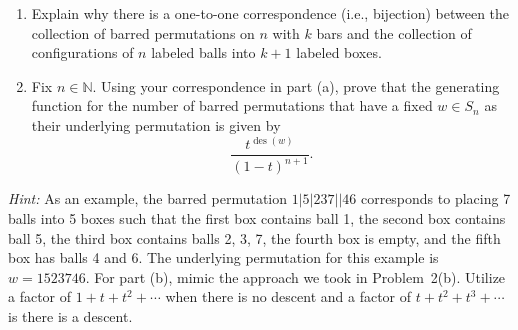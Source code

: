 \documentclass[11pt]{article}%
\theoremstyle{definition}
\DeclareMathOperator{\des}{des}
\begin{document}
\begin{enumerate}
\begin{enumerate}
\item Explain why there is a one-to-one correspondence (i.e., bijection) between the collection of barred permutations on $n$ with $k$ bars and the collection of configurations of $n$ labeled balls into $k+1$ labeled boxes.
\item Fix $n\in \mathbb{N}$. Using your correspondence in part (a), prove that the generating function for the number of barred permutations that have a fixed $w\in S_n$ as their underlying permutation is given by
\[
\frac{t^{\des(w)}}{(1-t)^{n+1}}.
\]
\end{enumerate}
\emph{Hint:} As an example, the barred permutation  $1|5|237||46$ corresponds to placing 7 balls into 5 boxes such that the first box contains ball 1, the second box contains ball 5, the third box contains balls 2, 3, 7, the fourth box is empty, and the fifth box has balls 4 and 6. The underlying permutation for this example is $w=1523746$. For part (b), mimic the approach we took in Problem~2(b).  Utilize a factor of $1+t+t^2+\cdots$ when there is no descent and a factor of $t+t^2+t^3+\cdots$ is there is a descent.
\end{enumerate}
\end{document}
